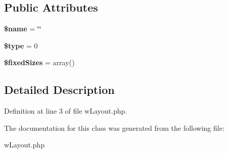 \subsection*{Public Attributes}
\begin{DoxyCompactItemize}
\item 
\hypertarget{classwLayout_a5d4af8f9bc8eb86e8eea8ca5b6a83510}{
{\bfseries \$name} = \char`\"{}\char`\"{}}
\label{classwLayout_a5d4af8f9bc8eb86e8eea8ca5b6a83510}

\item 
\hypertarget{classwLayout_aea829d2f9e128a6fed14a9066784c02e}{
{\bfseries \$type} = 0}
\label{classwLayout_aea829d2f9e128a6fed14a9066784c02e}

\item 
\hypertarget{classwLayout_acb03f54f9326d0086dd0ad0dd35f4754}{
{\bfseries \$fixedSizes} = array()}
\label{classwLayout_acb03f54f9326d0086dd0ad0dd35f4754}

\end{DoxyCompactItemize}


\subsection{Detailed Description}


Definition at line 3 of file wLayout.php.



The documentation for this class was generated from the following file:\begin{DoxyCompactItemize}
\item 
wLayout.php\end{DoxyCompactItemize}
